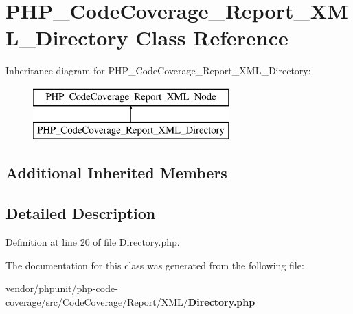 \section{P\+H\+P\+\_\+\+Code\+Coverage\+\_\+\+Report\+\_\+\+X\+M\+L\+\_\+\+Directory Class Reference}
\label{class_p_h_p___code_coverage___report___x_m_l___directory}
Inheritance diagram for P\+H\+P\+\_\+\+Code\+Coverage\+\_\+\+Report\+\_\+\+X\+M\+L\+\_\+\+Directory\+:\begin{figure}[H]
\begin{center}
\leavevmode
\includegraphics[height=2.000000cm]{class_p_h_p___code_coverage___report___x_m_l___directory}
\end{center}
\end{figure}
\subsection*{Additional Inherited Members}


\subsection{Detailed Description}


Definition at line 20 of file Directory.\+php.



The documentation for this class was generated from the following file\+:\begin{DoxyCompactItemize}
\item 
vendor/phpunit/php-\/code-\/coverage/src/\+Code\+Coverage/\+Report/\+X\+M\+L/{\bf Directory.\+php}\end{DoxyCompactItemize}
